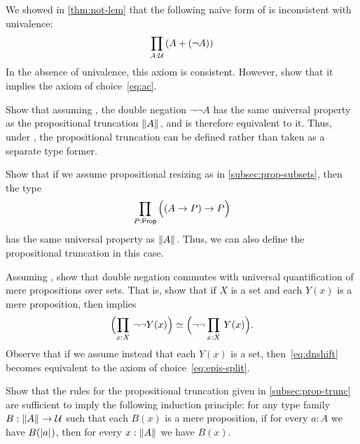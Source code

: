 \documentclass[hott-all.tex]{subfiles}
\begin{document}
\begin{ex}\label{ex:naive-lem-impl-ac}
  We showed in \cref{thm:not-lem} that the following naive form of \LEM{} is inconsistent with univalence:
  \[ \prd{A:\type} (A+(\neg A)) \]
  In the absence of univalence, this axiom is consistent.
  However, show that it implies the axiom of choice~\eqref{eq:ac}.
\end{ex}

\begin{ex}\label{ex:lem-brck}
  Show that assuming \LEM{}, the double negation $\neg \neg A$ has the same universal property as the propositional truncation $\mathopen{}\left\Vert A\right\Vert_{}\mathclose{}$, and is therefore equivalent to it.
  Thus, under \LEM{}, the propositional truncation can be defined rather than taken as a separate type former.
\end{ex}

\begin{ex}\label{ex:impred-brck}
  Show that if we assume propositional resizing as in \cref{subsec:prop-subsets}, then the type
  \[\prd{P:\prop} \Parens{(A\to P)\to P}\]
  has the same universal property as $\mathopen{}\left\Vert A\right\Vert_{}\mathclose{}$.
  Thus, we can also define the propositional truncation in this case.
\end{ex}

\begin{ex}\label{ex:lem-impl-dn-commutes}
  Assuming \LEM{}, show that double negation commutes with universal quantification of mere propositions over sets.
  That is, show that if $X$ is a set and each $Y(x)$ is a mere proposition, then \LEM{} implies
  \begin{equation}
    \eqv{\Parens{\prd{x:X} \neg\neg Y(x)}}{\Parens{\neg\neg \prd{x:X} Y(x)}}.\label{eq:dnshift}
  \end{equation}
  Observe that if we assume instead that each $Y(x)$ is a set, then~\eqref{eq:dnshift} becomes equivalent to the axiom of choice~\eqref{eq:epis-split}.
\end{ex}

\begin{ex}\label{ex:prop-trunc-ind}
  Show that the rules for the propositional truncation given in \cref{subsec:prop-trunc} are sufficient to imply the following induction principle: for any type family $B:\mathopen{}\left\Vert A\right\Vert_{}\mathclose{} \to \mathcal{U}$ such that each $B(x)$ is a mere proposition, if for every $a:A$ we have $B(\mathopen{}\left|a\right|_{}^{}\mathclose{})$, then for every $x:\mathopen{}\left\Vert A\right\Vert_{}\mathclose{}$ we have $B(x)$.
\end{ex}
\end{document}
